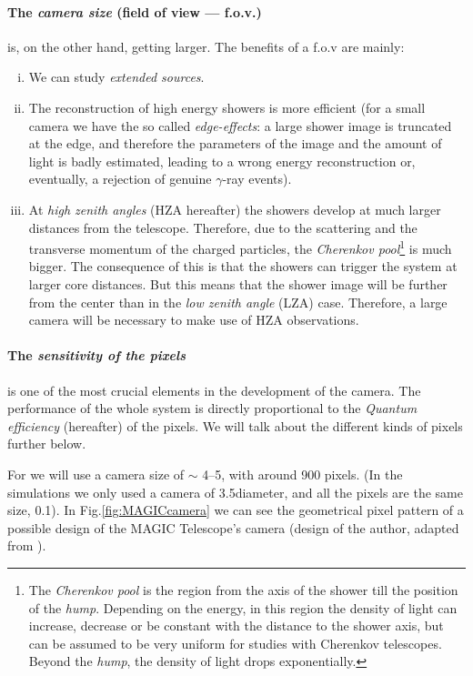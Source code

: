 \paragraph{The \emph{camera size} (field of view --- f.o.v.)} is, on
the other hand, getting larger. The benefits of a f.o.v are mainly:
%
\begin{enumerate}[i)]
\item We can study \emph{extended sources}.
%
\item The reconstruction of high energy showers is more efficient
(for a small camera we have the so called \emph{edge-effects}: a large
shower image is truncated at the edge, and therefore the parameters of
the image and the amount of light is badly estimated, leading to a
wrong energy reconstruction or, eventually, a rejection of genuine
$\gamma$-ray events).
%
\item At \emph{high zenith angles} (HZA hereafter) the showers develop
at much larger distances from the telescope. Therefore, due to the
scattering and the transverse momentum of the charged particles, the
\emph{Cherenkov pool}\footnote{The \emph{Cherenkov pool} is the region
from the axis of the shower till the position of the
\emph{hump}. Depending on the energy, in this region the density of
light can increase, decrease or be constant with the distance to the
shower axis, but can be assumed to be very uniform for studies with
Cherenkov telescopes. Beyond the \emph{hump}, the density of light
drops exponentially.} is much bigger. The consequence of this is that
the showers can trigger the system at larger core distances. But this
means that the shower image will be further from the center than in
the \emph{low zenith angle} (LZA) case. Therefore, a large camera will
be necessary to make use of HZA observations. 
\end{enumerate}

\paragraph{The \emph{sensitivity of the pixels}} is one of the most
crucial elements in the development of the camera. The performance of
the whole system is directly proportional to the \emph{Quantum
efficiency} (\QE hereafter) of the pixels. We will talk about the
different kinds of pixels further below.

\mirrorreflecfig

For \MAGIC we will use a camera size of $\sim$ 4\deg--5\deg, with
around 900 pixels. (In the simulations we only used a camera of
3.5\deg diameter, and all the pixels are the same size, 0.1\deg).  In
Fig.\ref{fig:MAGICcamera} we can see the geometrical pixel pattern of
a possible design of the MAGIC Telescope's camera (design of the
author, adapted from ).

